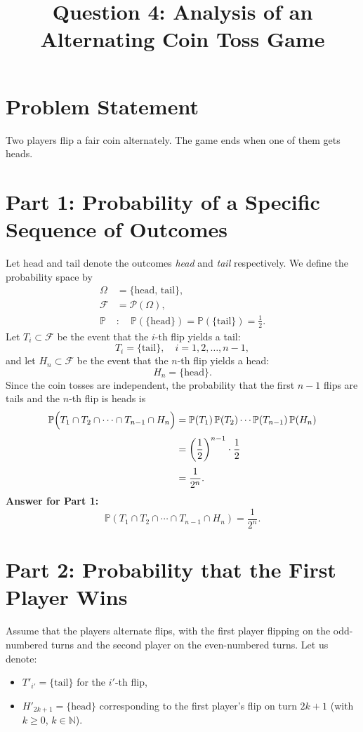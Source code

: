 \documentclass[12pt]{article}
\title{Question 4: Analysis of an Alternating Coin Toss Game}
\author{}
\date{}
\begin{document}
\maketitle
\onehalfspacing

\section*{Problem Statement}
Two players flip a fair coin alternately. The game ends when one of them gets heads.

\bigskip

\section*{Part 1: Probability of a Specific Sequence of Outcomes}
Let $\mathrm{head}$ and $\mathrm{tail}$ denote the outcomes \emph{head} and \emph{tail} respectively. We define the probability space by
\[
\begin{aligned}
\Omega &= \{\mathrm{head},\,\mathrm{tail}\},\\[1mm]
\mathcal{F} &= \mathcal{P}(\Omega),\\[1mm]
\mathbb{P} &:\quad \mathbb{P}(\{\mathrm{head}\}) = \mathbb{P}(\{\mathrm{tail}\}) = \frac{1}{2}.
\end{aligned}
\]
Let $T_i \subset \mathcal{F}$ be the event that the $i$-th flip yields a tail:
\[
T_i = \{\mathrm{tail}\}, \quad i=1,2,\dots,n-1,
\]
and let $H_n \subset \mathcal{F}$ be the event that the $n$-th flip yields a head:
\[
H_n = \{\mathrm{head}\}.
\]
Since the coin tosses are independent, the probability that the first $n-1$ flips are tails and the $n$-th flip is heads is
\[
\begin{aligned}
\mathbb{P}\Bigl(T_1\cap T_2\cap \cdots \cap T_{n-1}\cap H_n\Bigr)
&= \mathbb{P}(T_1)\,\mathbb{P}(T_2)\cdots\mathbb{P}(T_{n-1})\,\mathbb{P}(H_n)\\[1mm]
&= \left(\frac{1}{2}\right)^{n-1}\cdot\frac{1}{2}\\[1mm]
&= \frac{1}{2^n}.
\end{aligned}
\]
\textbf{Answer for Part 1:} 
\[
\boxed{\mathbb{P}(T_1\cap T_2\cap \cdots \cap T_{n-1}\cap H_n) = \frac{1}{2^n}}.
\]

\bigskip

\section*{Part 2: Probability that the First Player Wins}
Assume that the players alternate flips, with the first player flipping on the odd-numbered turns and the second player on the even-numbered turns. Let us denote:
\begin{itemize}
    \item ${T'}_{i'} = \{\mathrm{tail}\}$ for the $i'$-th flip,
    \item ${H'}_{2k+1} = \{\mathrm{head}\}$ corresponding to the first player's flip on turn $2k+1$ (with $k\ge0$, $k\in\mathbb{N}$).
\end{itemize}
\end{document}

